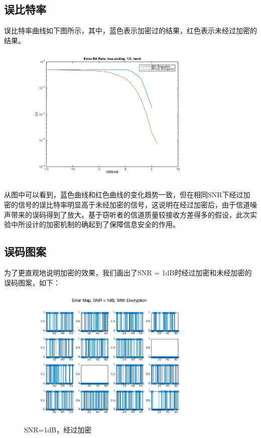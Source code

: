 \documentclass[UTF8]{ctexart}
\begin{document}
\subsection{误比特率}
误比特率曲线如下图所示，其中，蓝色表示加密过的结果，红色表示未经过加密的结果。

\begin{figure}[H]
    \centering
    \includegraphics[width = 0.8\textwidth]{error_bit_rate.png}
\end{figure}

从图中可以看到，蓝色曲线和红色曲线的变化趋势一致，但在相同SNR下经过加密的信号的误比特率明显高于未经加密的信号，这说明在经过加密后，由于信道噪声带来的误码得到了放大。基于窃听者的信道质量较接收方差得多的假设，此次实验中所设计的加密机制的确起到了保障信息安全的作用。

\subsection{误码图案}
为了更直观地说明加密的效果，我们画出了SNR = 1dB时经过加密和未经加密的误码图案，如下：

\begin{figure}[H]
    \centering
    \includegraphics[width = 0.8\textwidth]{error_map_1dB_with.png}
    \caption{SNR=1dB，经过加密}
\end{figure}
\end{document}
